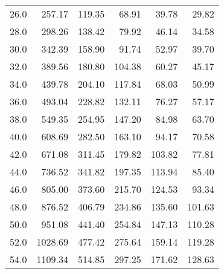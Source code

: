 \begin{tabular}{lrrrrr}
26.0 &                   257.17 &                   119.35 &                    68.91 &                    39.78 &                      29.82 \\
28.0 &                   298.26 &                   138.42 &                    79.92 &                    46.14 &                      34.58 \\
30.0 &                   342.39 &                   158.90 &                    91.74 &                    52.97 &                      39.70 \\
32.0 &                   389.56 &                   180.80 &                   104.38 &                    60.27 &                      45.17 \\
34.0 &                   439.78 &                   204.10 &                   117.84 &                    68.03 &                      50.99 \\
36.0 &                   493.04 &                   228.82 &                   132.11 &                    76.27 &                      57.17 \\
38.0 &                   549.35 &                   254.95 &                   147.20 &                    84.98 &                      63.70 \\
40.0 &                   608.69 &                   282.50 &                   163.10 &                    94.17 &                      70.58 \\
42.0 &                   671.08 &                   311.45 &                   179.82 &                   103.82 &                      77.81 \\
44.0 &                   736.52 &                   341.82 &                   197.35 &                   113.94 &                      85.40 \\
46.0 &                   805.00 &                   373.60 &                   215.70 &                   124.53 &                      93.34 \\
48.0 &                   876.52 &                   406.79 &                   234.86 &                   135.60 &                     101.63 \\
50.0 &                   951.08 &                   441.40 &                   254.84 &                   147.13 &                     110.28 \\
52.0 &                  1028.69 &                   477.42 &                   275.64 &                   159.14 &                     119.28 \\
54.0 &                  1109.34 &                   514.85 &                   297.25 &                   171.62 &                     128.63 \\

\end{tabular}
